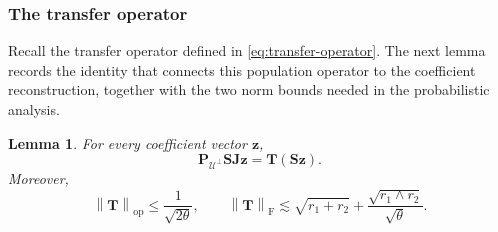 \documentclass[11pt]{article}
\newtheorem{lemma}{Lemma}
\newcommand{\opn}[1]{\left\lVert #1\right\rVert_{\mathrm{op}}}
\newcommand{\frn}[1]{\left\lVert #1\right\rVert_{\mathrm{F}}}
\newcommand{\cU}{\mathcal{U}}
\begin{document}
\subsubsection{The transfer operator}
\label{subsec:transfer}

Recall the transfer operator defined in \cref{eq:transfer-operator}.  The next
lemma records the identity that connects this population operator to the
coefficient reconstruction, together with the two norm bounds needed in the
probabilistic analysis.

\begin{lemma}
\label{lem:transfer}
For every coefficient vector $\bm z$,
\begin{equation}
\label{eq:transfer-identity}
  \bm P_{\cU^\perp}\bm S\bm J\bm z
  =
  \bm T(\bm S\bm z).
\end{equation}
Moreover,
\begin{equation}
\label{eq:transfer-op}
  \opn{\bm T}
  \le
  \frac{1}{\sqrt{2\theta}},
  \qquad
  \frn{\bm T}
  \lesssim
  \sqrt{r_1+r_2}
  +
  \frac{\sqrt{r_1\wedge r_2}}{\sqrt\theta}.
\end{equation}
\end{lemma}
\end{document}
